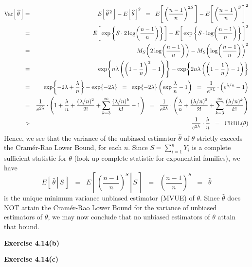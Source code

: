 \begin{eqnarray*}
\textnormal{Var}\!\left[\,\widehat{\theta}\,\right]
&=& E\!\left[\,\widehat{\theta}^{\,2}\,\right] - E\!\left[\,\widehat{\theta}\,\right]^{2}
\;\;=\;\; E\!\left[\,\left(\dfrac{n-1}{n}\right)^{2S}\,\right] - E\!\left[\,\left(\dfrac{n-1}{n}\right)^{S}\,\right]^{2} 
\\
&=& E\!\left[\,\exp\left\{S\cdot2\log\!\left(\dfrac{n-1}{n}\right)\right\}\,\right]
- E\!\left[\,\exp\left\{S\cdot\log\!\left(\dfrac{n-1}{n}\right)\right\}\,\right]^{2}
\\
&=& M_{S}\!\left(2\log\!\left(\dfrac{n-1}{n}\right)\right) - M_{S}\!\left(\log\!\left(\dfrac{n-1}{n}\right)\right)^{2}
\\
&=& \exp\!\left\{n\lambda\left(\left(1-\dfrac{1}{n}\right)^{2}-1\right)\right\}
- \exp\!\left\{2n\lambda\left(\left(1-\dfrac{1}{n}\right)-1\right)\right\}
\\
&=& \exp\!\left\{-2\lambda+\dfrac{\lambda}{n}\right\} - \exp\!\left\{-2\lambda\right\}
\;\;=\;\; \exp\!\left\{-2\lambda\right\}\left(\exp\dfrac{\lambda}{n} - 1\right)
\;\;=\;\; \dfrac{1}{e^{2\lambda}} \cdot \left(e^{\lambda/n}-1\right)
\\
&=& \dfrac{1}{e^{2\lambda}} \cdot \left(1 + \dfrac{\lambda}{n} + \dfrac{(\lambda/n)^{2}}{2!} + \sum_{k=3}^{\infty}\dfrac{(\lambda/n)^{k}}{k!} -1\right)
\;\;=\;\; \dfrac{1}{e^{2\lambda}} \cdot \left(\dfrac{\lambda}{n} + \dfrac{(\lambda/n)^{2}}{2!} + \sum_{k=3}^{\infty}\dfrac{(\lambda/n)^{k}}{k!}\right)
\\
&>& \dfrac{1}{e^{2\lambda}} \cdot \dfrac{\lambda}{n} \;\; = \;\; \textnormal{CRBL}(\theta)
\end{eqnarray*}
Hence, we see that the variance of the unbiased estimator $\widehat{\theta}$ of $\theta$ strictly exceeds the Cram\'er-Rao
Lower Bound, for each $n$. Since $S = \sum_{i=1}^{n}Y_{i}$ is a complete sufficient statistic for $\theta$ (look up complete statistic
for exponential families), we have
\begin{equation*}
E\!\left[\,\left.\widehat{\theta}\,\right\vert\,S\,\right]
\;\;=\;\; E\!\left[\,\left.\left(\dfrac{n-1}{n}\right)^{S}\,\right\vert\,S\,\right]
\;\;=\;\; \left(\dfrac{n-1}{n}\right)^{S}
\;\;=\;\; \widehat{\theta}
\end{equation*}
is the unique minimum variance unbiased estimator (MVUE) of $\theta$.
Since $\widehat{\theta}$ does NOT attain the Cram\'er-Rao Lower Bound for the variance of unbiased estimators of $\theta$,
we may now conclude that no unbiased estimators of $\theta$ attain that bound.

\vskip 1.0cm
\noindent
\textbf{Exercise 4.14(b)}

\vskip 1.0cm
\noindent
\textbf{Exercise 4.14(c)}

